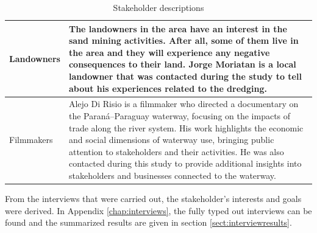 \begin{table}[H]
\begin{tabularx}{\linewidth}{p{3.5cm}X}
\midrule
Landowners & The landowners in the area have an interest in the sand mining activities. After all, some of them live in the area and they will experience any negative consequences to their land. Jorge Moriatan is a local landowner that was contacted during the study to tell about his experiences related to the dredging. \\
\midrule
Filmmakers & Alejo Di Risio is a filmmaker who directed a documentary on the Paraná–Paraguay waterway, focusing on the impacts of trade along the river system. His work highlights the economic and social dimensions of waterway use, bringing public attention to stakeholders and their activities. He was also contacted during this study to provide additional insights into stakeholders and businesses connected to the waterway. \\
\bottomrule
\end{tabularx}
\caption{Stakeholder descriptions}
\label{tab:stakeholders-description}
\end{table}

From the interviews that were carried out, the stakeholder's interests and goals were derived. In Appendix \ref{chap:interviews}, the fully typed out interviews can be found and the summarized results are given in section \ref{sect:interviewresults}.

